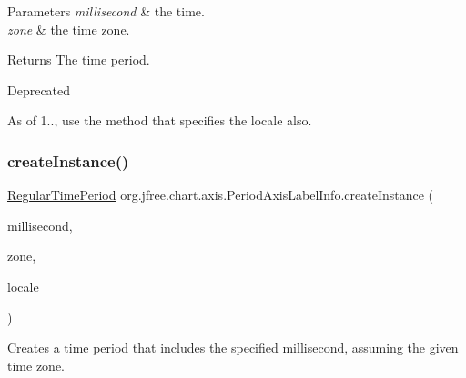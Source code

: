 \begin{DoxyParams}{Parameters}
{\em millisecond} & the time. \\
\hline
{\em zone} & the time zone.\\
\hline
\end{DoxyParams}
\begin{DoxyReturn}{Returns}
The time period.
\end{DoxyReturn}
\begin{DoxyRefDesc}{Deprecated}
\item[\mbox{\hyperlink{deprecated__deprecated000025}{Deprecated}}]As of 1.., use the method that specifies the locale also. \end{DoxyRefDesc}
\mbox{\label{classorg_1_1jfree_1_1chart_1_1axis_1_1_period_axis_label_info_a54d9b1e91ce898dbf6545b0e2ab43983}} 
\subsubsection{\texorpdfstring{create\+Instance()}{createInstance()}\hspace{0.1cm}{\footnotesize\ttfamily [2/2]}}
{\footnotesize\ttfamily \mbox{\hyperlink{classorg_1_1jfree_1_1data_1_1time_1_1_regular_time_period}{Regular\+Time\+Period}} org.\+jfree.\+chart.\+axis.\+Period\+Axis\+Label\+Info.\+create\+Instance (\begin{DoxyParamCaption}\item[{Date}]{millisecond,  }\item[{Time\+Zone}]{zone,  }\item[{Locale}]{locale }\end{DoxyParamCaption})}

Creates a time period that includes the specified millisecond, assuming the given time zone.


